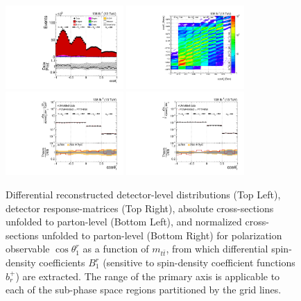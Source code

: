 \clearpage
\begin{figure}[htb]
\begin{center}
 \includegraphics[width=0.40\textwidth]{fig_fullRun2UL/controlplots/combined/Hyp_AntiLeptonBr_vs_TTBarMass.pdf}
 \includegraphics[width=0.40\textwidth]{fig_fullRun2UL/unfolding/combined/ResponseMatrix_b1r_mttbar.pdf} \\
 \includegraphics[width=0.40\textwidth]{fig_fullRun2UL/unfolding/combined/UnfoldedResults_b1r_mttbar.pdf}
 \includegraphics[width=0.40\textwidth]{fig_fullRun2UL/unfolding/combined/UnfoldedResultsNorm_b1r_mttbar.pdf} \\
\label{fig:b1r_mttbar}
\caption{Differential reconstructed detector-level distributions (Top Left), detector response-matrices (Top Right), absolute cross-sections unfolded to parton-level (Bottom Left), and normalized cross-sections unfolded to parton-level (Bottom Right) for polarization observable $\cos\theta_{1}^{r}$ as a function of $m_{t\bar{t}}$, from which differential spin-density coefficients $B_{1}^{r}$ (sensitive to spin-density coefficient functions $b_r^{+}$) are extracted.  The range of the primary axis is applicable to each of the sub-phase space regions partitioned by the grid lines.}
\end{center}
\end{figure}
